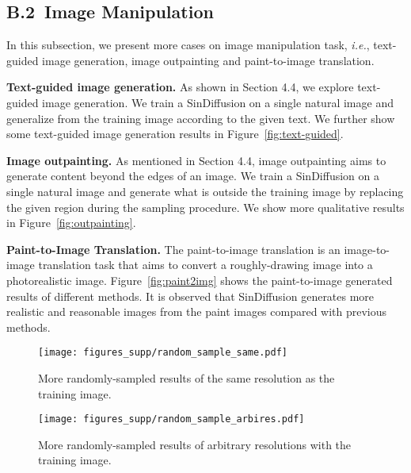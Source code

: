 \documentclass[10pt,twocolumn,letterpaper]{article}
\begin{document}
\subsection*{B.2~Image Manipulation}
In this subsection, we present more cases on image manipulation task, \emph{i.e.}, text-guided image generation, image outpainting and paint-to-image translation.

\vspace{2mm}
\noindent \textbf{Text-guided image generation.}
As shown in Section 4.4, we explore text-guided image generation.
We train a SinDiffusion on a single natural image and generalize from the training image according to the given text.
We further show some text-guided image generation results in Figure~\ref{fig:text-guided}.

\vspace{2mm}
\noindent \textbf{Image outpainting.}
As mentioned in Section 4.4, image outpainting aims to generate content beyond the edges of an image.
We train a SinDiffusion on a single natural image and generate what is outside the training image by replacing the given region during the sampling procedure.
We show more qualitative results in Figure~\ref{fig:outpainting}.

\vspace{2mm}
\noindent \textbf{Paint-to-Image Translation.}
The paint-to-image translation is an image-to-image translation task that aims to convert a roughly-drawing image into a photorealistic image.
Figure~\ref{fig:paint2img} shows the paint-to-image generated results of different methods.
It is observed that SinDiffusion generates more realistic and reasonable images from the paint images compared with previous methods.


\begin{figure*}[t]
    \centering
    \texttt{[image: figures\_supp/random\_sample\_same.pdf]}
    \vspace{-6mm}
    \caption{
    More randomly-sampled results of the same resolution as the training image.
    }
    \label{fig:sameres}
\end{figure*}

\begin{figure*}[t]
    \centering
    \texttt{[image: figures\_supp/random\_sample\_arbires.pdf]}
    \vspace{-6mm}
    \caption{
    More randomly-sampled results of arbitrary resolutions with the training image.
    }
    \label{fig:abrares}
\end{figure*}
\end{document}
